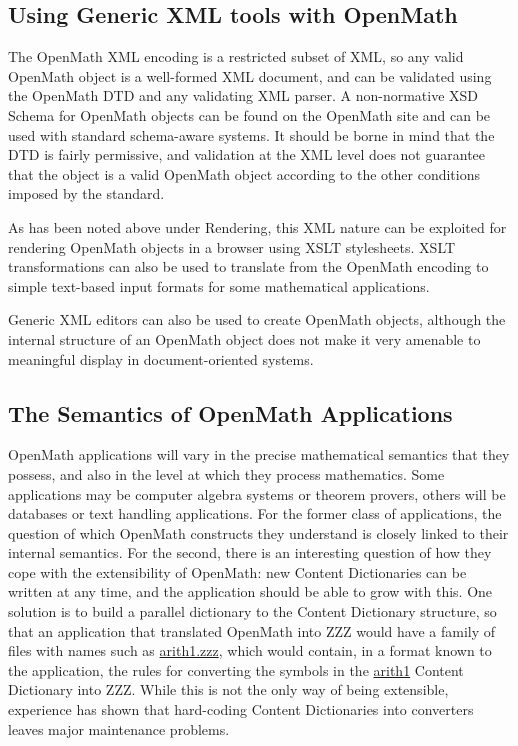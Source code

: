 \documentclass[report,keylogo]{openmath}
\begin{document}
\subsection {Using Generic XML tools with OpenMath}

The OpenMath XML encoding is a restricted subset of XML, so any valid
OpenMath object is a well-formed XML document, and can be validated
using the OpenMath DTD and any validating XML parser. A non-normative
XSD Schema for OpenMath objects can be found on the OpenMath site and
can be used with standard schema-aware systems.  It should be borne in
mind that the DTD is fairly permissive, and validation at the XML
level does not guarantee that the object is a valid OpenMath object
according to the other conditions imposed by the standard.

As has been noted above under Rendering, this XML nature can be
exploited for rendering OpenMath objects in a browser using XSLT
stylesheets. XSLT transformations can also be used to translate from
the OpenMath encoding to simple text-based input formats for some
mathematical applications.

Generic XML editors can also be used to create OpenMath objects,
although the internal structure of an OpenMath object does not make it
very amenable to meaningful display in document-oriented systems.





\subsection{The Semantics of OpenMath Applications}
OpenMath applications will vary in the precise mathematical semantics
that they possess, and also in the level at which they process
mathematics. Some applications may be computer algebra systems or
theorem provers, others will be databases or text handling
applications. For the former class of applications, the question of
which OpenMath constructs they understand is closely linked to their
internal semantics. For the second, there is an interesting question
of how they cope with the extensibility of OpenMath: new Content
Dictionaries can be written at any time, and the application should be
able to grow with this. One solution is to build a parallel dictionary
to the Content Dictionary structure, so that an application that
translated OpenMath into ZZZ would have a family of files with names
such as \url{arith1.zzz}, which would contain, in a format known to
the application, the rules for converting the symbols in the
\url{arith1} Content Dictionary into ZZZ. While this is not the only
way of being extensible, experience has shown that hard-coding Content
Dictionaries into converters leaves major maintenance problems.
\end{document}

